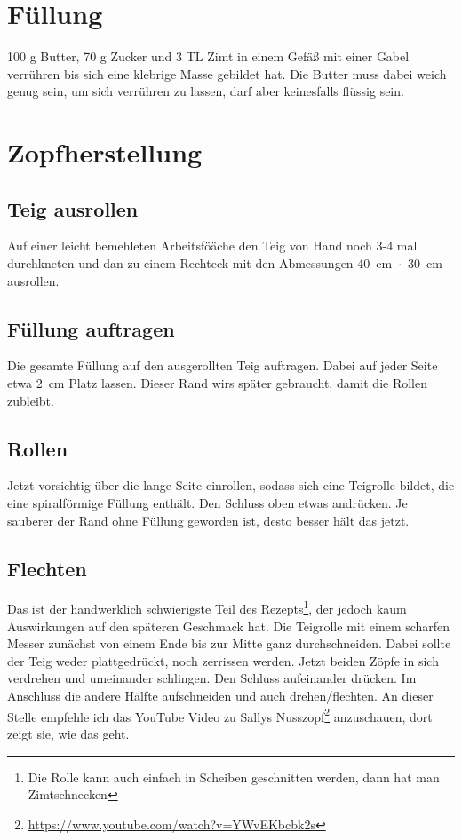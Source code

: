 \documentclass[a4paper, oneside]{recipe}
\begin{document}
\section*{Füllung}
100 g Butter, 70 g Zucker und 3 TL Zimt in einem Gefäß mit einer Gabel verrühren bis sich eine klebrige Masse gebildet hat. Die Butter muss dabei weich genug sein, um sich verrühren zu lassen, darf aber keinesfalls flüssig sein.

\section*{Zopfherstellung}
\subsection*{Teig ausrollen}
Auf einer leicht bemehleten Arbeitsföäche den Teig von Hand noch 3-4 mal durchkneten und dan zu einem Rechteck mit den Abmessungen 40~cm~$\cdot$~30~cm ausrollen.

\subsection*{Füllung auftragen}
Die gesamte Füllung auf den ausgerollten Teig auftragen. Dabei auf jeder Seite etwa 2~cm Platz lassen. Dieser Rand wirs später gebraucht, damit die Rollen zubleibt.

\subsection*{Rollen}
Jetzt vorsichtig über die lange Seite einrollen, sodass sich eine Teigrolle bildet, die eine spiralförmige Füllung enthält. Den Schluss oben etwas andrücken. Je sauberer der Rand ohne Füllung geworden ist, desto besser hält das jetzt.

\subsection*{Flechten}
Das ist der handwerklich schwierigste Teil des Rezepts\footnote{Die Rolle kann auch einfach in Scheiben geschnitten werden, dann hat man Zimtschnecken}, der jedoch kaum Auswirkungen auf den späteren Geschmack hat. 
Die Teigrolle mit einem scharfen Messer zunächst von einem Ende bis zur Mitte ganz durchschneiden. Dabei sollte der Teig weder plattgedrückt, noch zerrissen werden. Jetzt beiden Zöpfe in sich verdrehen und umeinander schlingen. Den Schluss aufeinander drücken. Im Anschluss die andere Hälfte aufschneiden und auch drehen/flechten. An dieser Stelle empfehle ich das YouTube Video zu Sallys Nusszopf\footnote{\url{https://www.youtube.com/watch?v=YWvEKbcbk2s}} anzuschauen, dort zeigt sie, wie das geht.
\end{document}
